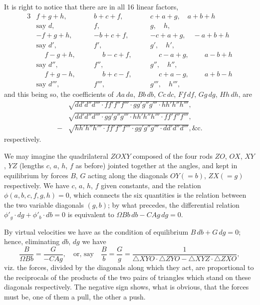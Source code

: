 \documentclass[11pt,a4paper]{article}
\theoremstyle{plain}
\theoremstyle{definition}
\theoremstyle{remark}
\begin{document}
It is right to notice that there are in all 16 linear factors,
\begin{alignat*}{3}
&f+g+h, \quad && b+c+f, \quad && c+a+g, \quad a+b+h \\
& \text{say } d, && f, && g, \quad h, \\
&-f+g+h, \quad && -b+c+f, \quad && -c+a+g, \quad -a+b+h \\
& \text{say } d', && f', && g', \quad h', \\
&\phantom{-}f-g+h, \quad && \phantom{-}b-c+f, \quad && \phantom{-}c-a+g, \quad \phantom{-}a-b+h \\
& \text{say } d'', && f'', && g'', \quad h'', \\
&\phantom{-}f+g-h, \quad && \phantom{-}b+c-f, \quad && \phantom{-}c+a-g, \quad \phantom{-}a+b-h \\
& \text{say } d''', && f''', && g''', \quad h''',
\end{alignat*}
and this being so, the coefficients of $Aa\,da$, $Bb\,db$,
$Cc\,dc$, $Ff\,df$, $Gg\,dg$, $Hh\,dh$, are
\begin{align*}
&\sqrt{dd'd''d''' \cdot ff'f''f''' \cdot gg'g''g''' \cdot hh'h''h'''}, \\
&\sqrt{dd'd''d''' \cdot gg'g''g''' \cdot hh'h''h''' \cdot ff'f''f'''}, \\
-&\sqrt{hh'h''h''' \cdot ff'f''f''' \cdot gg'g''g''' \cdot dd'd''d'''}, \&\text{c.}
\end{align*}
respectively.

We may imagine the quadrilateral $ZOXY$ composed of the four rods
$ZO$, $OX$, $XY$, $YZ$ (lengths $c$, $a$, $h$, $f$ as before) jointed
together at the angles, and kept in equilibrium by forces $B$, $G$
acting along the diagonals $OY (=b)$, $ZX (=g)$ respectively.
We have $c$, $a$, $h$, $f$ given constants, and the relation
$\phi(a,b,c,f,g,h) = 0$, which connects the six quantities is the
relation between the two variable diagonals $(g,b)$; by what precedes,
the differential relation $\phi'_g \cdot dg + \phi'_b \cdot db = 0$
is equivalent to $\Omega Bb\,db - CAg\,dg = 0$.

By virtual velocities we have as the condition of equilibrium
$B\,db + G\,dg = 0$;
hence, eliminating $db$, $dg$ we have
\[
\frac{B}{\Omega Bb} = \frac{G}{-CAg},
\quad\text{or, say}\quad
\frac{B}{b} = \frac{G}{g} = \frac{1}{\triangle XYO \cdot \triangle ZYO
- \triangle XYZ \cdot \triangle ZXO},
\]
viz. the forces, divided by the diagonals along which they act, are
proportional to the reciprocals of the products of the two pairs of
triangles which stand on these diagonals respectively.
The negative sign shows, what is obvious, that the forces must be, one
of them a pull, the other a push.
\end{document}
